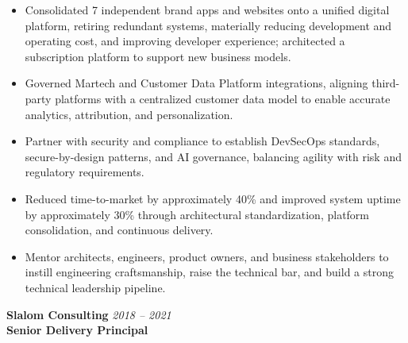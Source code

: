 \documentclass[11pt]{article}
\begin{document}
\begin{itemize}
  \item Consolidated 7 independent brand apps and websites onto a unified digital platform, retiring redundant systems, materially reducing development and operating cost, and improving developer experience; architected a subscription platform to support new business models.
  \item Governed Martech and Customer Data Platform integrations, aligning third-party platforms with a centralized customer data model to enable accurate analytics, attribution, and personalization.
  \item Partner with security and compliance to establish DevSecOps standards, secure-by-design patterns, and AI governance, balancing agility with risk and regulatory requirements.
  \item Reduced time-to-market by approximately 40\% and improved system uptime by approximately 30\% through architectural standardization, platform consolidation, and continuous delivery.
  \item Mentor architects, engineers, product owners, and business stakeholders to instill engineering craftsmanship, raise the technical bar, and build a strong technical leadership pipeline.
\end{itemize}

\vspace{6pt}

\textbf{Slalom Consulting} \hfill \textit{2018 -- 2021} \\
\textbf{Senior Delivery Principal}
\end{document}
